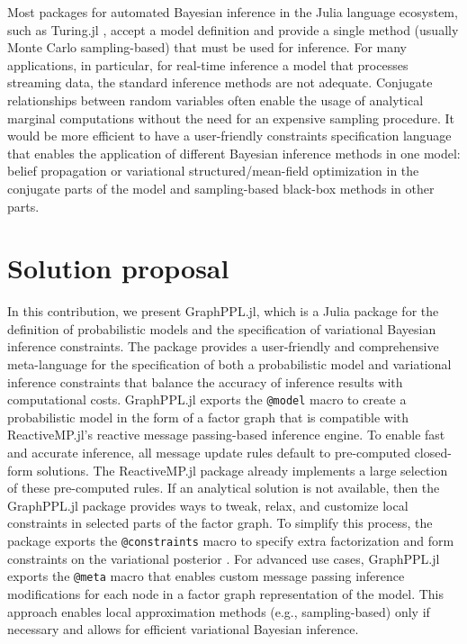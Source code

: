 \documentclass{juliacon}
\begin{document}
Most packages for automated Bayesian inference in the Julia language ecosystem, such as Turing.jl \cite{ge_turing_2018}, accept a model definition and provide a single method (usually Monte Carlo sampling-based) that must be used for inference. For many applications, in particular, for real-time inference a model that processes streaming data, the standard inference methods are not adequate. Conjugate relationships between random variables often enable the usage of analytical marginal computations without the need for an expensive sampling procedure. It would be more efficient to have a user-friendly constraints specification language that enables the application of different Bayesian inference methods in one model: belief propagation or variational structured/mean-field optimization in the conjugate parts of the model and sampling-based black-box methods in other parts.

\section{Solution proposal}

In this contribution, we present GraphPPL.jl, which is a Julia package for the definition of probabilistic models and the specification of variational Bayesian inference constraints. The package provides a user-friendly and comprehensive meta-language for the specification of both a probabilistic model and variational inference constraints that balance the accuracy of inference results with computational costs. GraphPPL.jl exports the \texttt{@model} macro to create a probabilistic model in the form of a factor graph that is compatible with ReactiveMP.jl's \cite{bagaev_reactivempjl_2022} reactive message passing-based inference engine. To enable fast and accurate inference, all message update rules default to pre-computed closed-form solutions. The ReactiveMP.jl package already implements a large selection of these pre-computed rules. If an analytical solution is not available, then the GraphPPL.jl package provides ways to tweak, relax, and customize local constraints in selected parts of the factor graph. To simplify this process, the package exports the \texttt{@constraints} macro to specify extra factorization and form constraints on the variational posterior \cite{senoz_variational_2021}. For advanced use cases, GraphPPL.jl exports the \texttt{@meta} macro that enables custom message passing inference modifications for each node in a factor graph representation of the model. This approach enables local approximation methods (e.g., sampling-based) only if necessary and allows for efficient variational Bayesian inference.
\end{document}
